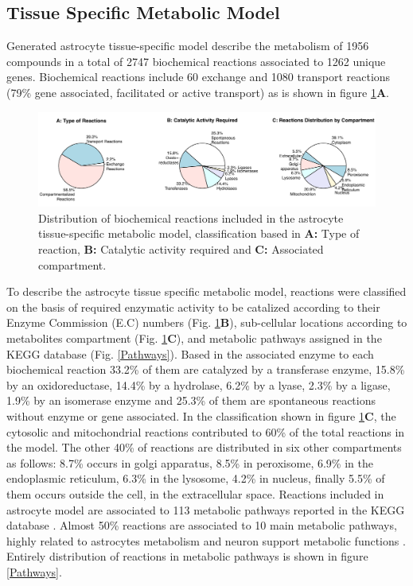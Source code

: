 \subsection*{Tissue Specific Metabolic Model}
Generated astrocyte tissue-specific model describe the metabolism of 1956 compounds in a total of 2747 biochemical reactions associated to 1262 unique genes. Biochemical reactions include 60 exchange and 1080 transport reactions (79\% gene associated, facilitated or active transport) as is shown in figure \ref{Reactions}\textbf{A}.  
\begin{figure}[h]
\begin{center}
\includegraphics[width=\textwidth]{neuroprotective/RXN}
\end{center}
\caption{Distribution of biochemical reactions included in the astrocyte tissue-specific metabolic model, classification based in \textbf{A:} Type of reaction, \textbf{B:} Catalytic activity required and \textbf{C:} Associated compartment.}
\label{Reactions}
\end{figure}

To describe the astrocyte tissue specific metabolic model, reactions were classified on the basis of required enzymatic activity to be catalized according to their Enzyme Commission (E.C) numbers (Fig. \ref{Reactions}\textbf{B}), sub-cellular locations according to metabolites compartment (Fig. \ref{Reactions}\textbf{C}), and metabolic pathways assigned in the KEGG database (Fig. \ref{Pathways}). 
Based in the associated enzyme to each biochemical reaction 33.2\% of them are catalyzed by a transferase enzyme, 15.8\% by an oxidoreductase, 14.4\% by a hydrolase, 6.2\% by a lyase, 2.3\% by a ligase, 1.9\% by an isomerase enzyme and 25.3\% of them are spontaneous reactions without enzyme or gene associated. 
In the classification shown in figure \ref{Reactions}\textbf{C}, the cytosolic and mitochondrial reactions contributed to 60\% of the total reactions in the model. The other 40\% of reactions are distributed in six other compartments as follows: 8.7\% occurs in golgi apparatus, 8.5\% in peroxisome, 6.9\% in the endoplasmic reticulum, 6.3\% in the lysosome, 4.2\% in nucleus, finally 5.5\% of them occurs outside the cell, in the extracellular space.
Reactions included in astrocyte model are associated to 113 metabolic pathways reported in the KEGG database \cite{Kanehisa2000}. Almost 50\% reactions are associated to 10 main metabolic pathways, highly related to astrocytes metabolism and neuron support metabolic functions \cite{Fitch1997,Ciccarelli2001,Cakir2007,Giaume2010, Sertbas2014, Sa2016}. Entirely distribution of reactions in metabolic pathways is shown in figure \ref{Pathways}. 

